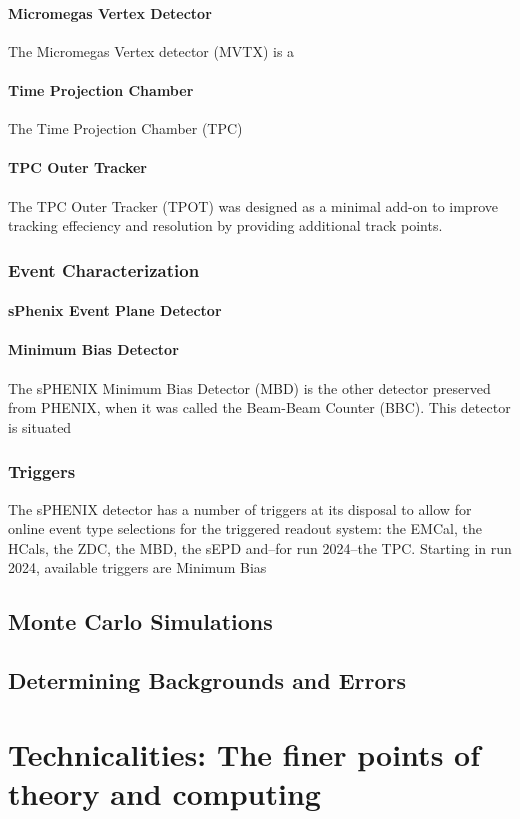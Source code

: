 \documentclass[letterpaper, 12pt, oneside]{book}
\theoremstyle{definition}
\begin{document}
	\subsection{Micromegas Vertex Detector}
	The Micromegas Vertex detector (MVTX) is a 
	\subsection{Time Projection Chamber}
	The Time Projection Chamber (TPC) 
	\subsection{TPC Outer Tracker}
	The TPC Outer Tracker (TPOT) was designed as a minimal add-on to improve tracking effeciency and resolution by providing additional track points. 
\section{Event Characterization}
	\subsection{sPhenix Event Plane Detector}
	\subsection{Minimum Bias Detector}
	The sPHENIX Minimum Bias Detector (MBD) is the other detector preserved from PHENIX, when it was called the Beam-Beam Counter (BBC). 
	This detector is situated  
\section{Triggers}
	The sPHENIX detector has a number of triggers at its disposal to allow for online event type selections for the triggered readout system: the EMCal, the HCals, the ZDC, the MBD, the sEPD and--for run 2024--the TPC.
	Starting in run 2024, available triggers are Minimum Bias 
\chapter{Monte Carlo Simulations}
\chapter{Determining Backgrounds and Errors}
\part{Technicalities: The finer points of theory and computing}
\end{document}
